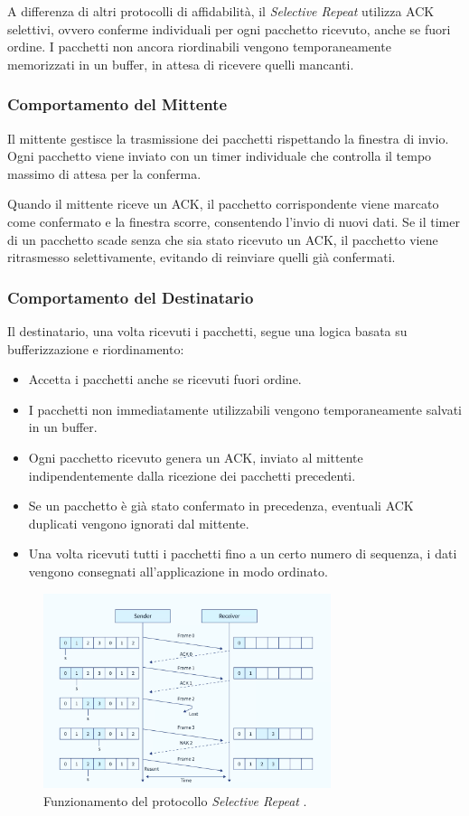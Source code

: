 A differenza di altri protocolli di affidabilità, il \textit{Selective Repeat}  utilizza ACK selettivi, ovvero conferme individuali per ogni pacchetto ricevuto, anche se fuori ordine.
I pacchetti non ancora riordinabili vengono temporaneamente memorizzati in un buffer, in attesa di ricevere quelli mancanti.

\subsubsection{Comportamento del Mittente}
Il mittente gestisce la trasmissione dei pacchetti rispettando la finestra di invio.
Ogni pacchetto viene inviato con un timer individuale che controlla il tempo massimo di attesa per la conferma.

Quando il mittente riceve un ACK, il pacchetto corrispondente viene marcato come confermato e la finestra scorre, consentendo l'invio di nuovi dati.
Se il timer di un pacchetto scade senza che sia stato ricevuto un ACK, il pacchetto viene ritrasmesso selettivamente, evitando di reinviare quelli già confermati.

\subsubsection{Comportamento del Destinatario}
Il destinatario, una volta ricevuti i pacchetti, segue una logica basata su bufferizzazione e riordinamento:
\begin{itemize}
    \item Accetta i pacchetti anche se ricevuti fuori ordine.
    \item I pacchetti non immediatamente utilizzabili vengono temporaneamente salvati in un buffer.
    \item Ogni pacchetto ricevuto genera un ACK, inviato al mittente indipendentemente dalla ricezione dei pacchetti precedenti.
    \item Se un pacchetto è già stato confermato in precedenza, eventuali ACK duplicati vengono ignorati dal mittente.
    \item Una volta ricevuti tutti i pacchetti fino a un certo numero di sequenza, i dati vengono consegnati all'applicazione in modo ordinato.
\end{itemize}

\begin{figure}[h]
    \centering
    \includegraphics[width=0.75\textwidth]{imgs/01/sr.png}
    \caption{Funzionamento del protocollo \textit{Selective Repeat} .}
\end{figure}

